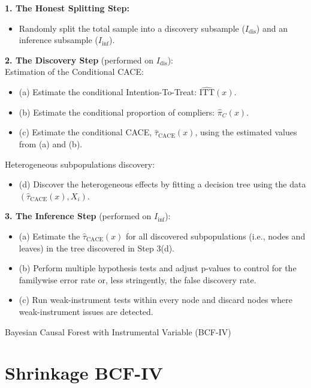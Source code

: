 \begin{algorithm}[H]
    \footnotesize
    \DontPrintSemicolon
    \SetAlgoLined
    \LinesNotNumbered
    \BlankLine
    \textbf{1. The Honest Splitting Step:} \\
    \begin{itemize}
        \item Randomly split the total sample into a discovery subsample ($I_{\text{dis}}$) and an inference subsample ($I_{\text{inf}}$).
    \end{itemize}
    \BlankLine
    \textbf{2. The Discovery Step} (performed on $I_{\text{dis}}$): \\
    Estimation of the Conditional CACE:
    \begin{itemize}
        \item (a) Estimate the conditional Intention-To-Treat: $\widehat{\text{ITT}}(x)$.
        \item (b) Estimate the conditional proportion of compliers: $\widehat{\pi}_C(x)$.
        \item (c) Estimate the conditional CACE, $\widehat{\tau}_{\text{CACE}}(x)$, using the estimated values from (a) and (b).
    \end{itemize}
    Heterogeneous subpopulations discovery:
    \begin{itemize}
        \item (d) Discover the heterogeneous effects by fitting a decision tree using the data $(\widehat{\tau}_{\text{CACE}}(x), X_i)$.
    \end{itemize}
    \BlankLine
    \textbf{3. The Inference Step} (performed on $I_{\text{inf}}$): \\
    \begin{itemize}
        \item (a) Estimate the $\widehat{\tau}_{\text{CACE}}(x)$ for all discovered subpopulations (i.e., nodes and leaves) in the tree discovered in Step 3(d).
        \item (b) Perform multiple hypothesis tests and adjust p-values to control for the familywise error rate or, less stringently, the false discovery rate. 
        \item (c) Run weak-instrument tests within every node and discard nodes where weak-instrument issues are detected.
    \end{itemize}
    \caption{Bayesian Causal Forest with Instrumental Variable (BCF-IV)}
    \label{algo:SBART+SPL}
\end{algorithm}

\section{Shrinkage BCF-IV}
\label{sec:SBCF-IV}



